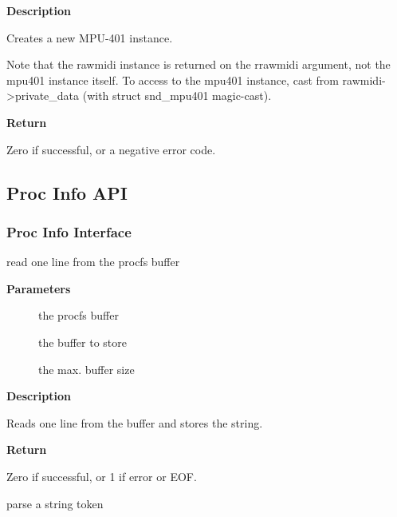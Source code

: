 \documentclass[a4paper,8pt,english]{sphinxmanual}
\begin{document}
\textbf{Description}

Creates a new MPU-401 instance.

Note that the rawmidi instance is returned on the rrawmidi argument,
not the mpu401 instance itself.  To access to the mpu401 instance,
cast from rawmidi-\textgreater{}private\_data (with struct snd\_mpu401 magic-cast).

\textbf{Return}

Zero if successful, or a negative error code.


\subsection{Proc Info API}
\label{sound/kernel-api/alsa-driver-api:proc-info-api}

\subsubsection{Proc Info Interface}
\label{sound/kernel-api/alsa-driver-api:proc-info-interface}

\begin{fulllineitems}
\label{sound/kernel-api/alsa-driver-api:c.snd_info_get_line}
read one line from the procfs buffer

\end{fulllineitems}


\textbf{Parameters}
\begin{description}
\item[{}] \leavevmode
the procfs buffer

\item[{}] \leavevmode
the buffer to store

\item[{}] \leavevmode
the max. buffer size

\end{description}

\textbf{Description}

Reads one line from the buffer and stores the string.

\textbf{Return}

Zero if successful, or 1 if error or EOF.

\begin{fulllineitems}
\label{sound/kernel-api/alsa-driver-api:c.snd_info_get_str}
parse a string token

\end{fulllineitems}
\end{document}
